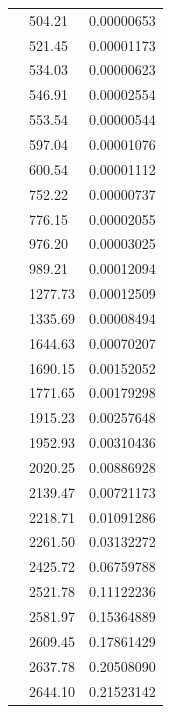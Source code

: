\documentclass[10pt,preprint,twocolumn]{acmart}
\begin{document}
\begin{supertabular}{|r|l|l|}
 & 504.21 & 0.00000653 \\
 & 521.45 & 0.00001173 \\
 & 534.03 & 0.00000623 \\
 & 546.91 & 0.00002554 \\
 & 553.54 & 0.00000544 \\
 & 597.04 & 0.00001076 \\
 & 600.54 & 0.00001112 \\
 & 752.22 & 0.00000737 \\
 & 776.15 & 0.00002055 \\
 & 976.20 & 0.00003025 \\
 & 989.21 & 0.00012094 \\
 & 1277.73 & 0.00012509 \\
 & 1335.69 & 0.00008494 \\
 & 1644.63 & 0.00070207 \\
 & 1690.15 & 0.00152052 \\
 & 1771.65 & 0.00179298 \\
 & 1915.23 & 0.00257648 \\
 & 1952.93 & 0.00310436 \\
 & 2020.25 & 0.00886928 \\
 & 2139.47 & 0.00721173 \\
 & 2218.71 & 0.01091286 \\
 & 2261.50 & 0.03132272 \\
 & 2425.72 & 0.06759788 \\
 & 2521.78 & 0.11122236 \\
 & 2581.97 & 0.15364889 \\
 & 2609.45 & 0.17861429 \\
 & 2637.78 & 0.20508090 \\
 & 2644.10 & 0.21523142 \\
\end{supertabular}
\end{document}
